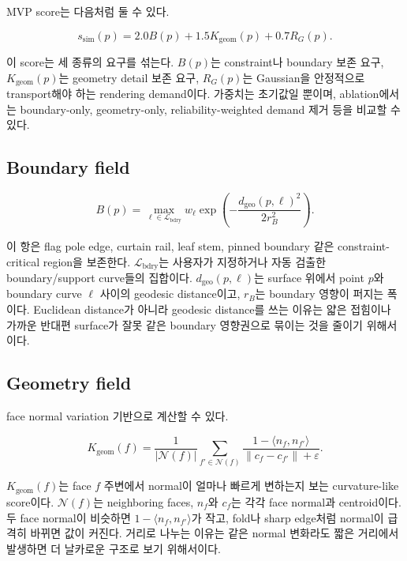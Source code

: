 \documentclass[11pt,a4paper]{article}
\newcommand{\eps}{\varepsilon}
\begin{document}
MVP score는 다음처럼 둘 수 있다.

\begin{equation}
s_{\mathrm{sim}}(p)=2.0B(p)+1.5K_{\mathrm{geom}}(p)+0.7R_G(p).
\end{equation}

이 score는 세 종류의 요구를 섞는다.
$B(p)$는 constraint나 boundary 보존 요구, $K_{\mathrm{geom}}(p)$는 geometry detail 보존 요구, $R_G(p)$는 Gaussian을 안정적으로 transport해야 하는 rendering demand이다.
가중치는 초기값일 뿐이며, ablation에서는 boundary-only, geometry-only, reliability-weighted demand 제거 등을 비교할 수 있다.

\subsection*{Boundary field}

\begin{equation}
B(p)=\max_{\ell\in\mathcal{L}_{\mathrm{bdry}}}w_\ell\exp\left(-\frac{d_{\mathrm{geo}}(p,\ell)^2}{2r_B^2}\right).
\end{equation}

이 항은 flag pole edge, curtain rail, leaf stem, pinned boundary 같은 constraint-critical region을 보존한다.
$\mathcal{L}_{\mathrm{bdry}}$는 사용자가 지정하거나 자동 검출한 boundary/support curve들의 집합이다.
$d_{\mathrm{geo}}(p,\ell)$는 surface 위에서 point $p$와 boundary curve $\ell$ 사이의 geodesic distance이고, $r_B$는 boundary 영향이 퍼지는 폭이다.
Euclidean distance가 아니라 geodesic distance를 쓰는 이유는 얇은 접힘이나 가까운 반대편 surface가 잘못 같은 boundary 영향권으로 묶이는 것을 줄이기 위해서이다.

\subsection*{Geometry field}

face normal variation 기반으로 계산할 수 있다.

\begin{equation}
K_{\mathrm{geom}}(f)=\frac{1}{|\mathcal{N}(f)|}\sum_{f'\in\mathcal{N}(f)}\frac{1-\langle n_f,n_{f'}\rangle}{\|c_f-c_{f'}\|+\eps}.
\end{equation}

$K_{\mathrm{geom}}(f)$는 face $f$ 주변에서 normal이 얼마나 빠르게 변하는지 보는 curvature-like score이다.
$\mathcal{N}(f)$는 neighboring faces, $n_f$와 $c_f$는 각각 face normal과 centroid이다.
두 face normal이 비슷하면 $1-\langle n_f,n_{f'}\rangle$가 작고, fold나 sharp edge처럼 normal이 급격히 바뀌면 값이 커진다.
거리로 나누는 이유는 같은 normal 변화라도 짧은 거리에서 발생하면 더 날카로운 구조로 보기 위해서이다.
\end{document}
